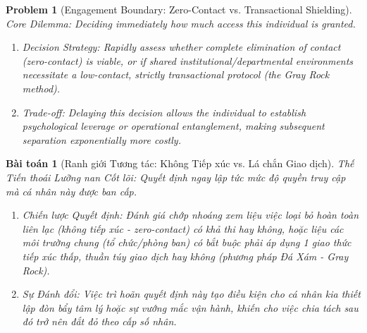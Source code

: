 \documentclass{article}
\newtheorem{problem}{Problem}
\newtheorem{baitoan}{Bài toán}
\begin{document}
\begin{problem}[Engagement Boundary: Zero-Contact vs. Transactional Shielding]
	\emph{Core Dilemma:} Deciding immediately how much access this individual is granted.
	\begin{enumerate}[label=(\roman*)]
		\item \emph{Decision Strategy:} Rapidly assess whether complete elimination of contact (zero-contact) is viable, or if shared institutional/departmental environments necessitate a \textit{low-contact, strictly transactional} protocol (the Gray Rock method).
		\item \emph{Trade-off:} Delaying this decision allows the individual to establish psychological leverage or operational entanglement, making subsequent separation exponentially more costly.
	\end{enumerate}
\end{problem}
\begin{baitoan}[Ranh giới Tương tác: Không Tiếp xúc vs. Lá chắn Giao dịch]
	\emph{Thế Tiến thoái Lưỡng nan Cốt lõi:} Quyết định ngay lập tức mức độ quyền truy cập mà cá nhân này được ban cấp.
	\begin{enumerate}[label=(\roman*)]
		\item \emph{Chiến lược Quyết định:} Đánh giá chớp nhoáng xem liệu việc loại bỏ hoàn toàn liên lạc (không tiếp xúc - zero-contact) có khả thi hay không, hoặc liệu các môi trường chung (tổ chức/phòng ban) có bắt buộc phải áp dụng 1 giao thức \textit{tiếp xúc thấp, thuần túy giao dịch} hay không (phương pháp Đá Xám - Gray Rock).
		\item \emph{Sự Đánh đổi:} Việc trì hoãn quyết định này tạo điều kiện cho cá nhân kia thiết lập đòn bẩy tâm lý hoặc sự vướng mắc vận hành, khiến cho việc chia tách sau đó trở nên đắt đỏ theo cấp số nhân.
	\end{enumerate}
\end{baitoan}
\end{document}
